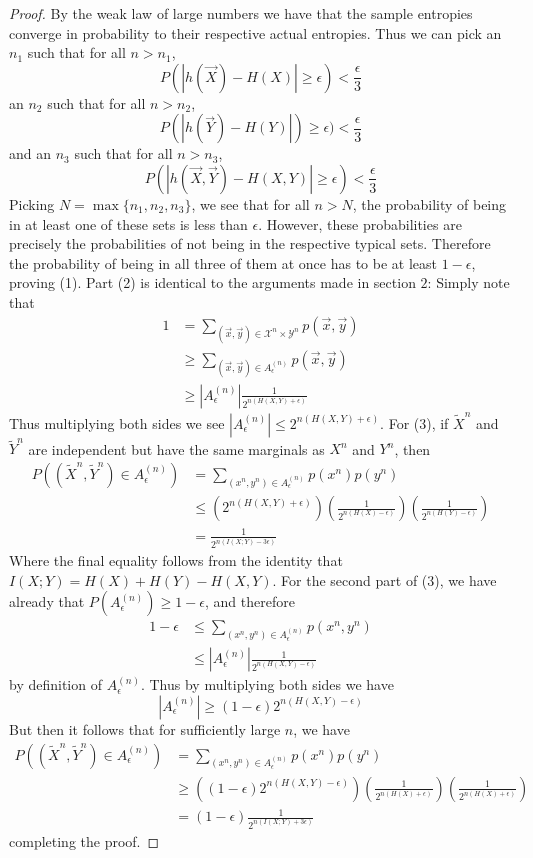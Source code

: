 \documentclass{article}
\theoremstyle{definition}
\theoremstyle{plain}
\begin{document}
\begin{proof}
	By the weak law of large numbers we have that the sample entropies converge in probability to their respective actual entropies. Thus we can pick an $n_1$ such that for all $n > n_1$, 
	\[ P(|h(\vec{X})-H(X)| \geq \epsilon) < \frac{\epsilon}{3}\]
an $n_2$ such that for all $n > n_2$,
\[ P(|h(\vec{Y})-H(Y)|) \geq \epsilon) < \frac{\epsilon}{3} \]
and an $n_3$ such that for all $n > n_3$,
 \[  P(|h(\vec{X},\vec{Y})-H(X,Y)| \geq \epsilon) < \frac{\epsilon}{3}\]
 Picking $N = \max\{n_1,n_2,n_3\}$, we see that for all $n > N$, the probability of being in at least one of these sets is less than $\epsilon$. However, these probabilities are precisely the probabilities of not being in the respective typical sets. Therefore the probability of being in all three of them at once has to be at least $1-\epsilon$, proving (1). Part (2) is identical to the arguments made in section $2$: Simply note that 
 \begin{align}
 	1 &= \sum_{(\vec{x},\vec{y}) \in \mathcal{X}^n \times \mathcal{Y}^n} p(\vec{x},\vec{y}) \\
 	&\geq \sum_{(\vec{x},\vec{y}) \in A_{\epsilon}^{(n)}} p(\vec{x},\vec{y}) \\
 	&\geq |A_{\epsilon}^{(n)}|\frac{1}{2^{n(H(X,Y)+\epsilon)}}
 \end{align}
 Thus multiplying both sides we see $|A_{\epsilon}^{(n)}| \leq 2^{n(H(X,Y)+\epsilon)}$. For (3), if $\tilde{X}^n$ and $\tilde{Y}^n$ are independent but have the same marginals as $X^n$ and $Y^n$, then 
 \begin{align}
 	P((\tilde{X}^n,\tilde{Y}^n) \in A_{\epsilon}^{(n)}) &= \sum_{(x^n,y^n) \in A_{\epsilon}^{(n)}} p(x^n)p(y^n)  \\
 	&\leq \left( 2^{n(H(X,Y)+\epsilon)}\right)\left( \frac{1}{2^{n(H(X)-\epsilon)}} \right) \left( \frac{1}{2^{n(H(Y)-\epsilon)}} \right) \\
 	&= \frac{1}{2^{n(I(X;Y)-3\epsilon)}}
 \end{align}
 Where the final equality follows from the identity that $I(X;Y) = H(X)+H(Y)-H(X,Y)$. For the second part of (3), we have already that $P(A_{\epsilon}^{(n)}) \geq 1-\epsilon$, and therefore 
 \begin{align}
 	1-\epsilon &\leq \sum_{(x^n,y^n) \in A_{\epsilon}^{(n)}} p(x^n,y^n) \\
 			&\leq |A_{\epsilon}^{(n)}|\frac{1}{2^{n(H(X,Y)-\epsilon)}} 
 \end{align}
 by definition of $A_{\epsilon}^{(n)}$. Thus by multiplying both sides we have 
 \[ |A_{\epsilon}^{(n)}| \geq (1-\epsilon)2^{n(H(X,Y)-\epsilon)} \]
 But then it follows that for sufficiently large $n$, we have 
 \begin{align}
 	P((\tilde{X}^n,\tilde{Y}^n) \in A_{\epsilon}^{(n)}) &= \sum_{(x^n,y^n) \in A_{\epsilon}^{(n)}}p(x^n)p(y^n) \\ &\geq \left((1-\epsilon)2^{n(H(X,Y)-\epsilon)}\right) \left( \frac{1}{2^{n(H(X)+\epsilon)}} \right)\left( \frac{1}{2^{n(H(X)+\epsilon)}} \right) \\
 	&= (1-\epsilon)\frac{1}{2^{n(I(X;Y)+3\epsilon)}}
 \end{align}
 completing the proof. 
\end{proof}
\end{document}

